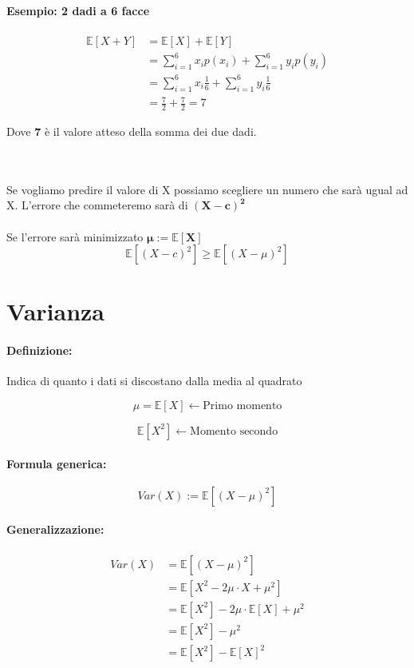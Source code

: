 \documentclass[]{article}
\newcommand{\ev}{\mathbb{E}[X]}
\renewcommand{\ev}[1]{\mathbb{E}[#1]}
\newcommand{\definizione}{\paragraph{Definizione:}}
\newcommand{\formula}{\paragraph{Formula generica:}}
\begin{document}
    \paragraph{Esempio: 2 dadi a 6 facce}
    \begin{equation*}
      \begin{split}
        \ev{X + Y} & = \ev{X} + \ev{Y} \\
        & = \sum_{i = 1}^{6} x_i p(x_i) + \sum_{i = 1}^{6} y_i p(y_i) \\
        & = \sum_{i = 1}^{6} x_i \frac{1}{6} + \sum_{i = 1}^{6} y_i \frac{1}{6} \\
        & = \frac{7}{2} + \frac{7}{2} = 7 
      \end{split}  
    \end{equation*}
    \centerline{Dove \textbf{7} è il valore atteso della somma dei due dadi.} \\ \\
    Se vogliamo predire il valore di X possiamo scegliere un numero che sarà ugual ad X.
    L'errore che commeteremo sarà di $\boldsymbol{(X - c)^2}$ \\ \\
    Se \boldsymbol{$c = \ev{X}$} l'errore sarà minimizzato $\boldsymbol{\mu := \ev{X}}$
    \[ \ev{(X - c)^2} \geq \ev{(X - \mu)^2}\]

    \section{Varianza}
    \definizione Indica di quanto i dati si discostano dalla media al quadrato \\
    \begin{minipage}{0.45\textwidth}
        \[ \mu = \ev{X} \leftarrow \text{Primo momento}\]
    \end{minipage}
    \begin{minipage}{0.45\textwidth}
        \[ \ev{X^2} \leftarrow \text{Momento secondo}\]
    \end{minipage}

    \formula \[ Var(X) := \ev{(X - \mu)^2} \]
    \paragraph{Generalizzazione:}
    \begin{equation*}
        \begin{split}
            Var(X) & = \ev{(X - \mu)^2} \\
            & = \ev{X^2 - 2 \mu \cdot X + \mu^2} \\
            & = \ev{X^2} - 2 \mu \cdot \ev{X} + \mu^2 \\
            & = \ev{X^2} - \mu^2 \\ 
            & = \ev{X^2} - \ev{X}^2
        \end{split}
    \end{equation*}
    
\end{document}

